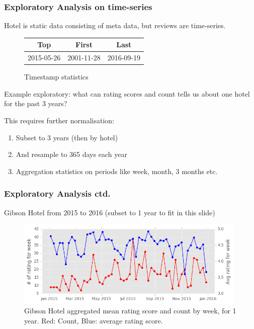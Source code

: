 \documentclass[xetex,mathserif,serif]{beamer}
\begin{document}
\begin{frame}
\frametitle{Exploratory Analysis on time-series}
Hotel is static data consisting of meta data, but reviews are time-series.

\begin{figure}[h]
\centering
\fboxsep 0mm
\begin{tabular}{c|cc}
Top & First & Last\\
\hline
2015-05-26 & 2001-11-28 & 2016-09-19
\end{tabular}
\caption{Timestamp statistics}
\end{figure}

Example exploratory: what can rating scores and count tells us about one hotel for the past 3 years?

This requires further normalisation:

\begin{enumerate}
	\item Subset to 3 years (then by hotel)
	\item And resample to 365 days each year
	\item Aggregation statistics on periods like week, month, 3 months etc.
\end{enumerate}

\end{frame}


\begin{frame}
\frametitle{Exploratory Analysis ctd.}

Gibson Hotel from 2015 to 2016 (subset to 1 year to fit in this slide)

\begin{figure}[h]
\centering
\fboxsep 0mm
\includegraphics[width=11cm]{gibson_hotel_dublin_rating_score_vs_count}	
\caption{Gibson Hotel aggregated mean rating score and count by week, for 1 year. Red: Count, Blue: average rating score. }
\end{figure}

\end{frame}
\end{document}
